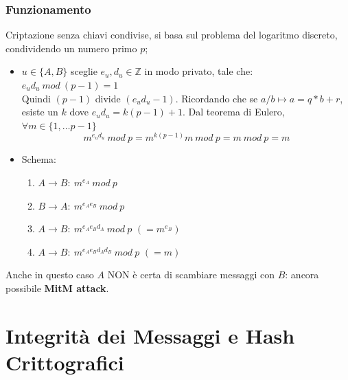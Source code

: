 \documentclass[11pt, a4paper, twoside, italian]{report}
\theoremstyle{plain}
\begin{document}
\subsection*{Funzionamento}
Criptazione senza chiavi condivise, si basa sul problema del logaritmo discreto, condividendo un numero primo $p$;
\begin{itemize}
	\item $u \in \{A,B\}$ sceglie $e_{u}, d_{u} \in \mathbb{Z}$ in modo privato, tale che: $ e_{u}d_{u}\ mod\ (p-1) = 1 $\\ Quindi $(p-1)$ divide $(e_{u}d_{u} -1)$. Ricordando che se $a/b \longmapsto a = q*b+r$, esiste un $k$ dove $e_{u}d_{u} = k(p-1)+1$. Dal teorema di Eulero, $\forall m \in \{1,\dots p-1\}$ \[ m^{e_{u}d_{u}}\ mod\ p = m^{k(p-1)}m\ mod\ p = m\ mod\ p = m \]
	\item Schema:
	\begin{enumerate}
		\item $A \longrightarrow B:\ m^{e_{A}}\ mod\ p$
		\item $B \longrightarrow A:\ m^{e_{A}e_{B}}\ mod\ p$
		\item $A \longrightarrow B:\ m^{e_{A}e_{B}d_{A}}\ mod\ p$ $(= m^{e_{B}})$
		\item $A \longrightarrow B:\ m^{e_{A}e_{B}d_{A}d_{B}}\ mod\ p$ $(= m)$
	\end{enumerate}
\end{itemize}
\noindent
Anche in questo caso $A$ NON è certa di scambiare messaggi con $B$: ancora possibile \textbf{MitM attack}.



\chapter*{Integrità dei Messaggi e Hash Crittografici}
\end{document}
